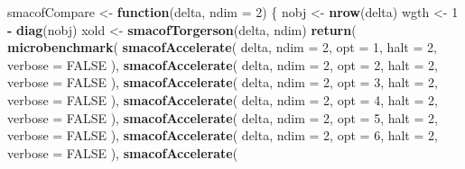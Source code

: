 \documentclass[
  12pt,
]{article}
\newenvironment{Shaded}{\begin{snugshade}}{\end{snugshade}}
\newcommand{\AttributeTok}[1]{\textcolor[rgb]{0.13,0.29,0.53}{#1}}
\newcommand{\ConstantTok}[1]{\textcolor[rgb]{0.56,0.35,0.01}{#1}}
\newcommand{\ControlFlowTok}[1]{\textcolor[rgb]{0.13,0.29,0.53}{\textbf{#1}}}
\newcommand{\DecValTok}[1]{\textcolor[rgb]{0.00,0.00,0.81}{#1}}
\newcommand{\FunctionTok}[1]{\textcolor[rgb]{0.13,0.29,0.53}{\textbf{#1}}}
\newcommand{\NormalTok}[1]{#1}
\newcommand{\OtherTok}[1]{\textcolor[rgb]{0.56,0.35,0.01}{#1}}
\newcommand{\SpecialCharTok}[1]{\textcolor[rgb]{0.81,0.36,0.00}{\textbf{#1}}}
\begin{document}
\begin{Shaded}
\begin{Highlighting}[]
\NormalTok{smacofCompare }\OtherTok{\textless{}{-}} \ControlFlowTok{function}\NormalTok{(delta, }\AttributeTok{ndim =} \DecValTok{2}\NormalTok{) \{}
\NormalTok{  nobj }\OtherTok{\textless{}{-}} \FunctionTok{nrow}\NormalTok{(delta)}
\NormalTok{  wgth }\OtherTok{\textless{}{-}} \DecValTok{1} \SpecialCharTok{{-}} \FunctionTok{diag}\NormalTok{(nobj)}
\NormalTok{  xold }\OtherTok{\textless{}{-}} \FunctionTok{smacofTorgerson}\NormalTok{(delta, ndim)}
  \FunctionTok{return}\NormalTok{(}
    \FunctionTok{microbenchmark}\NormalTok{(}
      \FunctionTok{smacofAccelerate}\NormalTok{(}
\NormalTok{        delta,}
        \AttributeTok{ndim =} \DecValTok{2}\NormalTok{,}
        \AttributeTok{opt =} \DecValTok{1}\NormalTok{,}
        \AttributeTok{halt =} \DecValTok{2}\NormalTok{,}
        \AttributeTok{verbose =} \ConstantTok{FALSE}
\NormalTok{      ),}
      \FunctionTok{smacofAccelerate}\NormalTok{(}
\NormalTok{        delta,}
        \AttributeTok{ndim =} \DecValTok{2}\NormalTok{,}
        \AttributeTok{opt =} \DecValTok{2}\NormalTok{,}
        \AttributeTok{halt =} \DecValTok{2}\NormalTok{,}
        \AttributeTok{verbose =} \ConstantTok{FALSE}
\NormalTok{      ),}
      \FunctionTok{smacofAccelerate}\NormalTok{(}
\NormalTok{        delta,}
        \AttributeTok{ndim =} \DecValTok{2}\NormalTok{,}
        \AttributeTok{opt =} \DecValTok{3}\NormalTok{,}
        \AttributeTok{halt =} \DecValTok{2}\NormalTok{,}
        \AttributeTok{verbose =} \ConstantTok{FALSE}
\NormalTok{      ),}
      \FunctionTok{smacofAccelerate}\NormalTok{(}
\NormalTok{        delta,}
        \AttributeTok{ndim =} \DecValTok{2}\NormalTok{,}
        \AttributeTok{opt =} \DecValTok{4}\NormalTok{,}
        \AttributeTok{halt =} \DecValTok{2}\NormalTok{,}
        \AttributeTok{verbose =} \ConstantTok{FALSE}
\NormalTok{      ),}
      \FunctionTok{smacofAccelerate}\NormalTok{(}
\NormalTok{        delta,}
        \AttributeTok{ndim =} \DecValTok{2}\NormalTok{,}
        \AttributeTok{opt =} \DecValTok{5}\NormalTok{,}
        \AttributeTok{halt =} \DecValTok{2}\NormalTok{,}
        \AttributeTok{verbose =} \ConstantTok{FALSE}
\NormalTok{      ),}
      \FunctionTok{smacofAccelerate}\NormalTok{(}
\NormalTok{        delta,}
        \AttributeTok{ndim =} \DecValTok{2}\NormalTok{,}
        \AttributeTok{opt =} \DecValTok{6}\NormalTok{,}
        \AttributeTok{halt =} \DecValTok{2}\NormalTok{,}
        \AttributeTok{verbose =} \ConstantTok{FALSE}
\NormalTok{      ),}
      \FunctionTok{smacofAccelerate}\NormalTok{(}

\end{Highlighting}
\end{Shaded}
\end{document}
